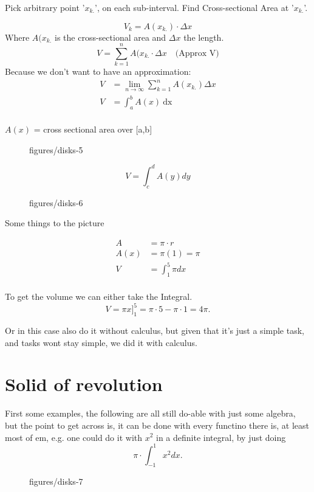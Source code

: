 \documentclass{book}
\begin{document}
Pick arbitrary point '$x_{k.}$', on each sub-interval. Find Cross-sectional Area at '$x_{k.}$'.

\[ V_k=A(x_{k.})\cdot \Delta x \] 
Where $A(x_{k.}$ is the cross-sectional area and $\Delta x$ the length.
\[V=\sum^n_{k=1} A(x_{k.}\cdot \Delta x \quad  \text{(Approx V)} \] 
Because we don't want to have an approximation:
\begin{align*}
    V&= \lim_{n\to\infty} \sum^n_{k=1}A(x_{k.})\Delta x \\
    V&= \int_{a}^{b} A(x) \ \text{dx}  \\
\end{align*}

$A(x)$ = cross sectional area over [a,b]

\vspace{50pt}


\begin{figure}[ht]
    \centering
    \caption{figures/disks-5}
    \label{fig:disks-5}
\end{figure}

\[V=\int_{c}^{d} A(y) dy\] 

\begin{figure}[ht]
    \centering
    \caption{figures/disks-6}
    \label{fig:disks-6}
\end{figure}

Some things to the picture

\begin{align*}
    A &= \pi\cdot r \\
    A(x) &= \pi(1)=\pi \\
    V&= \int_{1}^{5} \pi dx  \\
\end{align*}

To get the volume we can either take the Integral.
\[ V=\pi x ]^5_1=\pi\cdot 5-\pi\cdot 1=4\pi .\] 

Or in this case also do it without calculus, but given that it's just a simple
task, and tasks wont stay simple, we did it with calculus.

\clearpage
\section{Solid of revolution}

First some examples, the following are all still do-able with just some
algebra, but the point to get across is, it can be done with every functino
there is, at least most of em, e.g. one could do it with $x^2$ in a definite
integral, by just doing 
\[ \pi\cdot \int_{-1}^{1} x^2 dx .\] 

\begin{figure}[ht]
    \centering
    \caption{figures/disks-7}
    \label{fig:disks-7}
\end{figure}

\end{document}
